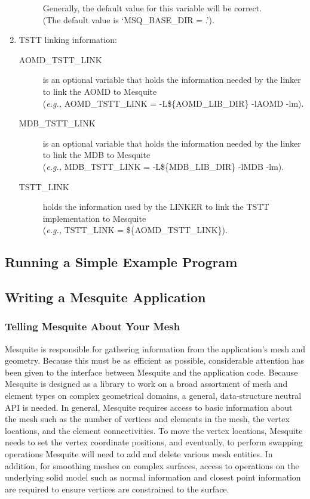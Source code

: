 \documentclass[psfig]{article}
\begin{document}
\begin{enumerate}
\begin{description}
	Generally, the default value for this variable will be correct.\\
	(The default value is `MSQ\_BASE\_DIR = .').
  \end{description}
\item TSTT linking information:
\begin{description}
  \item[AOMD\_TSTT\_LINK] is an optional variable that holds the
	information needed by the linker to link the AOMD to Mesquite\\
	({\it e.g.,} AOMD\_TSTT\_LINK = -L\$\{AOMD\_LIB\_DIR\} -lAOMD -lm).
  \item[MDB\_TSTT\_LINK] is an optional variable that holds the
	information needed by the linker to link the MDB to Mesquite\\
	({\it e.g.,} MDB\_TSTT\_LINK = -L\$\{MDB\_LIB\_DIR\} -lMDB -lm).
  \item[TSTT\_LINK] holds the information used by the LINKER to link
	the TSTT implementation to Mesquite \\
	({\it e.g.,} TSTT\_LINK = \$\{AOMD\_TSTT\_LINK\}).
\end{description}
\end{enumerate}

\subsection{Running a Simple Example Program}

\subsection{Writing a Mesquite Application}

\subsubsection{Telling Mesquite About Your Mesh}

Mesquite is responsible for gathering information from the
application's mesh and geometry.  Because this must be as efficient as
possible, considerable attention has been given to the interface
between Mesquite and the application code.  Because Mesquite is
designed as a library to work on a broad assortment of mesh and
element types on complex geometrical domains, a general,
data-structure neutral API is needed.  In general, Mesquite requires
access to basic information about the mesh such as the number of
vertices and elements in the mesh, the vertex locations, and the
element connectivities.  To move the vertex locations, Mesquite needs
to set the vertex coordinate positions, and eventually, to perform
swapping operations Mesquite will need to add and delete various mesh
entities.  In addition, for smoothing meshes on complex surfaces,
access to operations on the underlying solid model such as normal
information and closest point information are required to ensure
vertices are constrained to the surface.
\end{document}
